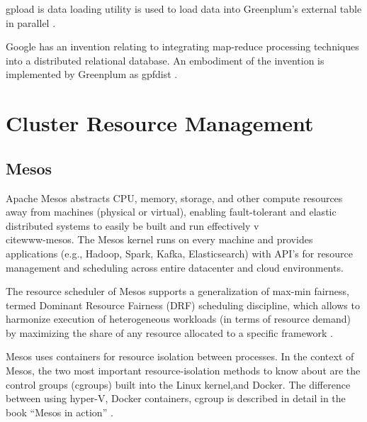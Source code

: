 {     gpload is data loading
     utility is used to load data into Greenplum's external table in
     parallel \cite{book-greenplum-gollapudi2013}.

     Google has an invention relating to
     integrating map-reduce processing techniques into a distributed
     relational database. An embodiment of the invention is
     implemented by Greenplum as gpfdist \cite{patent-google-gpf}.

     \pv

\section{Cluster Resource Management}
\label{S:o-cluster}


\subsection{Mesos }

     Apache Mesos abstracts CPU, memory,
     storage, and other compute resources away from machines (physical
     or virtual), enabling fault-tolerant and elastic distributed
     systems to easily be built and run effectively v\\cite{www-mesos}.
     The Mesos kernel
     runs on every machine and provides applications (e.g., Hadoop,
     Spark, Kafka, Elasticsearch) with API’s for resource management
     and scheduling across entire datacenter and cloud environments.

     The resource scheduler of Mesos supports a generalization of
     max-min fairness, termed Dominant
     Resource Fairness (DRF)
     scheduling discipline, which allows to harmonize execution of
     heterogeneous workloads (in terms of resource demand) by
     maximizing the share of any resource allocated to a specific
     framework \cite{paper-mesos-Abu-Dbai-2016} \cite{paper-mesos-ghodsi2011dominant}.
     
     Mesos uses containers for resource isolation between
     processes. In the context of Mesos, the two most important
     resource-isolation methods to know about are the control groups
     (cgroups) built into the Linux kernel,and Docker. The difference
     between using hyper-V, Docker containers, cgroup is described in
     detail in the book ``Mesos in action'' \cite{book-mesos-Ignazio-2016}.

}
